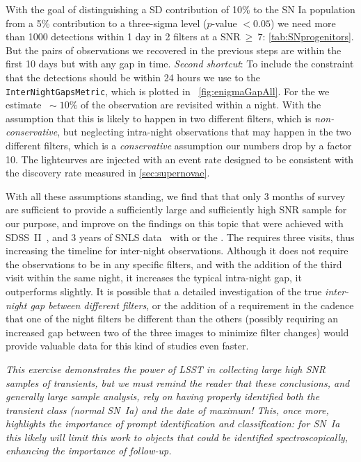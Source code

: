 With the goal of distinguishing a SD contribution of 10\% to the SN Ia
population from a 5\% contribution to a three-sigma level ($p$-value
$<0.05$) we need more than 1000 detections within 1 day in 2 filters
at a $\mathrm{SNR}~\geq~7$: \autoref{tab:SNprogenitors}. But the pairs
of observations we recovered in the previous steps are within the
first 10 days but with any gap in time. \emph{Second shortcut}: To
include the constraint that the detections should be within 24 hours
we use to the \texttt{InterNightGapsMetric}, which is plotted in
~\autoref{fig:enigmaGapAll}.  For the  we
estimate $~\sim10\%$ of the observation are revisited within a
night. With the assumption that this is likely to happen in two
different filters, which is \emph{non-conservative}, but neglecting
intra-night observations that may happen in the two different filters,
which is a \emph{conservative} assumption our numbers drop by a factor
10. The lightcurves are injected with an event rate designed to be
consistent with the discovery rate measured in \ref{sec:supernovae}.

With all these assumptions standing, we find that that only 3 months
of survey are sufficient to provide a sufficiently large and
sufficiently high SNR sample for our purpose, and improve on the
findings on this topic that were achieved with
SDSS~II~\citep{Hayden2010}, and 3 years of SNLS data~\citep{Bianco11}
with  or the
. The
 requires three visits, thus
increasing the timeline for inter-night observations. Although it does not
require the observations to be in any specific filters, and with the
addition of the third visit within the same night, it increases the
typical intra-night gap, it outperforms  slightly.
It is possible that a detailed investigation
of the true \emph{inter-night gap between different filters}, or the
addition of a requirement in the cadence that one of the night filters
be different than the others (possibly requiring an increased gap
between two of the three images to minimize filter changes) would
provide valuable data for this kind of studies even faster.

\emph{This exercise demonstrates the power of LSST in collecting large high SNR samples of transients, but we must remind the reader that these conclusions, and generally large sample analysis, rely on having properly identified both the transient class (normal SN~Ia) and the date of maximum! This, once more, highlights the importance of prompt identification and classification: for SN~Ia this likely will limit this work to objects that could be identified spectroscopically, enhancing the importance of follow-up.}


